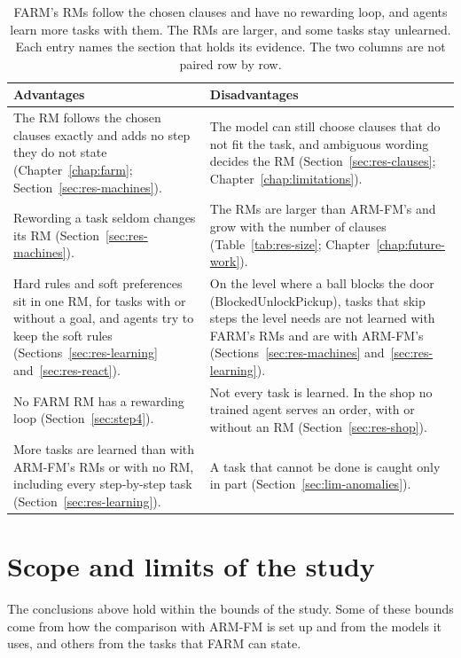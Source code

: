 \documentclass[11pt,english,listoffigures,listoftables]{tfgetsinf}
\begin{document}
\begin{table}[H]
\centering
\footnotesize
\renewcommand{\arraystretch}{1.2}
\begin{tabularx}{\textwidth}{@{}>{\raggedright\arraybackslash}X>{\raggedright\arraybackslash}X@{}}
\toprule
\textbf{Advantages} & \textbf{Disadvantages} \\ \midrule
The RM follows the chosen clauses exactly and adds no step they do not state (Chapter~\ref{chap:farm}; Section~\ref{sec:res-machines}). & The model can still choose clauses that do not fit the task, and ambiguous wording decides the RM (Section~\ref{sec:res-clauses}; Chapter~\ref{chap:limitations}). \\ \midrule
Rewording a task seldom changes its RM (Section~\ref{sec:res-machines}). & The RMs are larger than ARM-FM's and grow with the number of clauses (Table~\ref{tab:res-size}; Chapter~\ref{chap:future-work}). \\ \midrule
Hard rules and soft preferences sit in one RM, for tasks with or without a goal, and agents try to keep the soft rules (Sections~\ref{sec:res-learning} and~\ref{sec:res-react}). & On the level where a ball blocks the door (BlockedUnlockPickup), tasks that skip steps the level needs are not learned with FARM's RMs and are with ARM-FM's (Sections~\ref{sec:res-machines} and~\ref{sec:res-learning}). \\ \midrule
No FARM RM has a rewarding loop (Section~\ref{sec:step4}). & Not every task is learned. In the shop no trained agent serves an order, with or without an RM (Section~\ref{sec:res-shop}). \\ \midrule
More tasks are learned than with ARM-FM's RMs or with no RM, including every step-by-step task (Section~\ref{sec:res-learning}). & A task that cannot be done is caught only in part (Section~\ref{sec:lim-anomalies}). \\ \bottomrule
\end{tabularx}
\caption[Advantages and disadvantages of FARM]{FARM's RMs follow the chosen clauses and have no rewarding loop, and agents learn more tasks with them. The RMs are larger, and some tasks stay unlearned. Each entry names the section that holds its evidence. The two columns are not paired row by row.}
\label{tab:conc-summary}
\end{table}

\section{Scope and limits of the study}
\label{sec:scope}
The conclusions above hold within the bounds of the study. Some of these bounds come from how the comparison with ARM-FM is set up and from the models it uses, and others from the tasks that FARM can state.
\end{document}
